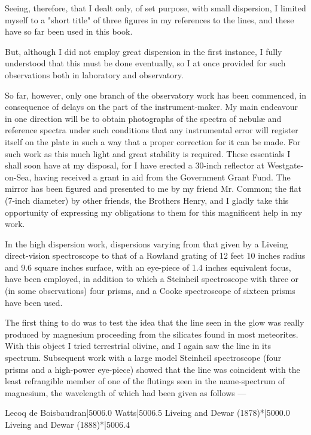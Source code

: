 \documentclass[a4paper, 12pt, oneside, polutonikogreek, english]{article}
\begin{document}
Seeing, therefore, that I dealt only, of set purpose, with small dispersion, I limited myself to a "short title" of three figures in my references to the lines, and these have so far been used in this book.

But, although I did not employ great dispersion in the first instance, I fully understood that this must be done eventually, so I at once provided for such observations both in laboratory and observatory.

So far, however, only one branch of the observatory work has been commenced, in consequence of delays on the part of the instrument-maker. My main endeavour in one direction will be to obtain photographs of the spectra of nebulæ and reference spectra under such conditions that any instrumental error will register itself on the plate in such a way that a proper correction for it can be made. For such work as this much light and great stability is required. These essentials I shall soon have at my disposal, for I have erected a 30-inch reflector at Westgate-on-Sea, having received a grant in aid from the Government Grant Fund. The mirror has been figured and presented to me by my friend Mr. Common; the flat (7-inch diameter) by other friends, the Brothers Henry, and I gladly take this opportunity of expressing my obligations to them for this magnificent help in my work.

In the high dispersion work, dispersions varying from that given by a Liveing direct-vision spectroscope to that of a Rowland grating of 12 feet 10 inches radius and 9.6 square inches surface, with an eye-piece of 1.4 inches equivalent focus, have been employed, in addition to which a Steinheil spectroscope with three or (in some observations) four prisms, and a Cooke spectroscope of sixteen prisms have been used.

The first thing to do was to test the idea that the line seen in the glow was really produced by magnesium proceeding from the silicates found in most meteorites. With this object I tried terrestrial olivine, and I again saw the line in its spectrum. Subsequent work with a large model Steinheil spectroscope (four prisms and a high-power eye-piece) showed that the line was coincident with the least refrangible member of one of the flutings seen in the name-spectrum of magnesium, the wavelength of which had been given as follows ---

Lecoq de Boisbaudran|5006.0 
Watts|5006.5 
Liveing and Dewar (1878)*|5000.0 
Liveing and Dewar (1888)*|5006.4
\end{document}
